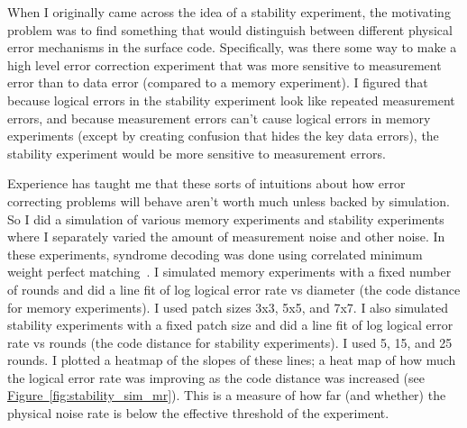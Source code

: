 \documentclass[onecolumn,unpublished,a4paper]{quantumarticle}
\theoremstyle{definition}
\theoremstyle{definition}
\theoremstyle{definition}
\newcommand{\fig}[1]{\hyperref[fig:#1]{Figure~\ref*{fig:#1}}}
\begin{document}
When I originally came across the idea of a stability experiment, the motivating problem was to find something that would distinguish between different physical error mechanisms in the surface code.
Specifically, was there some way to make a high level error correction experiment that was more sensitive to measurement error than to data error (compared to a memory experiment).
I figured that because logical errors in the stability experiment look like repeated measurement errors, and because measurement errors can't cause logical errors in memory experiments (except by creating confusion that hides the key data errors), the stability experiment would be more sensitive to measurement errors.

Experience has taught me that these sorts of intuitions about how error correcting problems will behave aren't worth much unless backed by simulation.
So I did a simulation of various memory experiments and stability experiments where I separately varied the amount of measurement noise and other noise.
In these experiments, syndrome decoding was done using correlated minimum weight perfect matching~\cite{fowler2013optimal}.
I simulated memory experiments with a fixed number of rounds and did a line fit of log logical error rate vs diameter (the code distance for memory experiments).
I used patch sizes 3x3, 5x5, and 7x7.
I also simulated stability experiments with a fixed patch size and did a line fit of log logical error rate vs rounds (the code distance for stability experiments).
I used 5, 15, and 25 rounds.
I plotted a heatmap of the slopes of these lines; a heat map of how much the logical error rate was improving as the code distance was increased (see \fig{stability_sim_mr}).
This is a measure of how far (and whether) the physical noise rate is below the effective threshold of the experiment.
\end{document}
